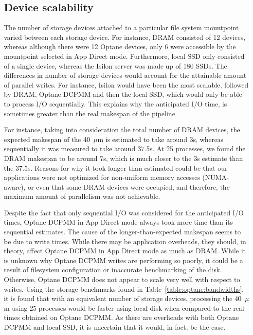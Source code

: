 \subsection{Device scalability}
The number of storage devices attached to a particular file system mountpoint
varied between each storage device. For instance, DRAM consisted of 12 devices,
whereas although there were 12 Optane devices, only 6 were accessible by the
mountpoint selected in App Direct mode. Furthermore, local SSD only consisted of
a single device, whereas the Isilon server was made up of 180 SSDs. The
differences in number of storage devices would account for the attainable amount
of parallel writes. For instance, Isilon would have been the most scalable,
followed by DRAM, Optane DCPMM and then the local SSD, which would only be able
to process I/O sequentially. This explains why the anticipated I/O time, is
sometimes greater than the real makespan of the pipeline.

For instance, taking into consideration the total number of DRAM devices, the
expected makespan of the 40~$\mu$m \bigbrain is estimated to take around 3s,
whereas sequentially it was measured to take around 37.5s. At 25 processes, we
found the DRAM makespan to be around 7s, which is much closer to the 3s estimate
than the 37.5s. Reasons for why it took longer than estimated could be that our
applications were not optimized for non-uniform memory accesses (NUMA-aware), or
even that some DRAM devices were occupied, and therefore, the maximum amount of
parallelism was not achievable. 

Despite the fact that only sequential I/O was considered for the anticipated I/O
times, Optane DCPMM in App Direct mode always took more time than its sequential
estimates. The cause of the longer-than-expected makespan seems to be due to
write times. While there may be application overheads, they should, in theory,
affect Optane DCPMM in App Direct mode as much as DRAM. While it is unknown why
Optane DCPMM writes are performing so poorly, it could be a result of filesystem
configuration or inaccurate benchmarking of the disk. Otherwise, Optane DCPMM
does not appear to scale very well with respect to writes. Using the storage
benchmarks found in Table~\ref{table:optane:bandwidths}, it is found that with an
equivalent number of storage devices, processing the 40~$\mu$m \bigbrain using
25 processes would be faster using local disk when compared to the real times
obtained on Optane DCPMM. As there are overheads with both Optane DCPMM and
local SSD, it is uncertain that it would, in fact, be the case.

